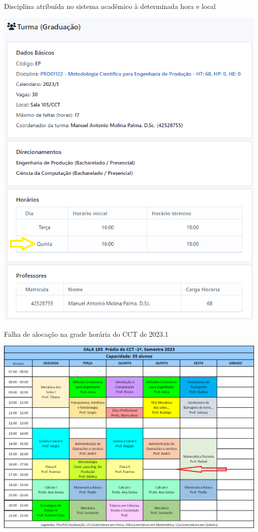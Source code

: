 \begin{MyCenteredFigure}
  \caption{Disciplina atribuída no sistema acadêmico à determinada hora e local}
  \label{fig:Academico}
  \includegraphics[width=\textwidth]{files/img/2.02!3-organizacao/2.02!3.1.5-erros/Metodologia-Quinta}
\end{MyCenteredFigure}    %

\begin{MyCenteredFigure}
  \caption{Falha de alocação na grade horária do CCT de 2023.1}
  \label{fig:CCT}
  \includegraphics[width=\textwidth]{files/img/2.02!3-organizacao/2.02!3.1.5-erros/Aulas-CCT-105-2023_1}
\end{MyCenteredFigure}    %

